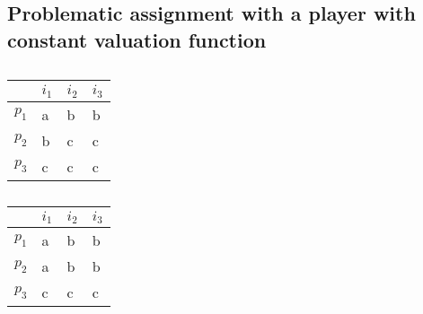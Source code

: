 \documentclass{article}
\begin{document}
\subsection{Problematic assignment with a player with constant valuation function}

\begin{table}[!h]
    \begin{minipage}{.5\linewidth}
      \centering
        \begin{tabular}{|l|l|l|l|}
            \hline
                  & $i_1$ & $i_2$ & $i_3$ \\ \hline
            $p_1$ & a     & b     & b     \\ \hline
            $p_2$ & b     & c     & c     \\ \hline
            $p_3$ & c     & c     & c     \\ \hline
            
        \end{tabular}
        \caption{}
        \label{table:3-players-abb-bcc-ccc}
    \end{minipage}%
    \begin{minipage}{.5\linewidth}
      \centering
        \begin{tabular}{|l|l|l|l|}
            \hline
                  & $i_1$ & $i_2$ & $i_3$ \\ \hline
            $p_1$ & a     & b     & b     \\ \hline
            $p_2$ & a     & b     & b     \\ \hline
            $p_3$ & c     & c     & c     \\ \hline
        \end{tabular}
        \caption{}
    \end{minipage} 
\end{table}
\end{document}
